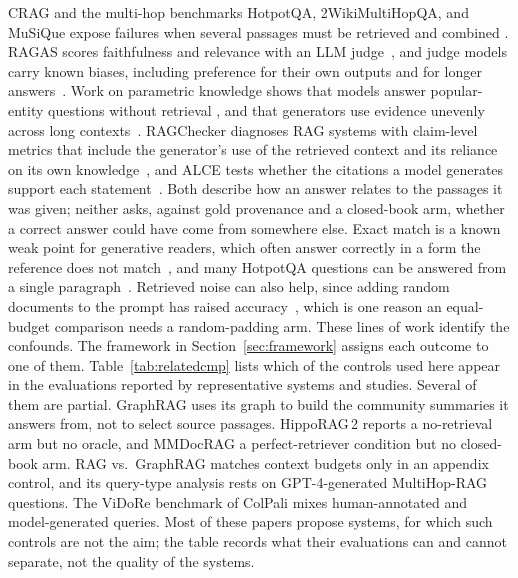 \documentclass[preprint,12pt]{elsarticle}
\begin{document}
CRAG and the multi-hop benchmarks HotpotQA, 2WikiMultiHopQA, and MuSiQue
expose failures when several passages must be retrieved and combined
\cite{yang2024crag,yang2018hotpotqa,ho20202wiki,trivedi2022musique}. RAGAS
scores faithfulness and relevance with an LLM judge~\cite{ragas}, and judge
models carry known biases, including preference for their own outputs and for
longer answers~\cite{zheng2023judge}. Work on parametric knowledge shows that
models answer popular-entity questions without retrieval
\cite{roberts2020knowledge,mallen2023popqa,kandpal2023longtail}, and that
generators use evidence unevenly across long contexts~\cite{liu2024lost}.
RAGChecker diagnoses RAG systems with claim-level metrics that include the
generator's use of the retrieved context and its reliance on its own
knowledge~\cite{ru2024ragchecker}, and ALCE tests whether the citations a
model generates support each statement~\cite{gao2023alce}. Both describe how
an answer relates to the passages it was given; neither asks, against gold
provenance and a closed-book arm, whether a correct answer could have come
from somewhere else. Exact match is a known weak point for generative readers,
which often answer correctly in a form the reference does not
match~\cite{kamalloo2023evaluating}, and many HotpotQA questions can be
answered from a single paragraph~\cite{min2019compositional,chen2019understanding}.
Retrieved noise can also help, since adding random documents to the prompt
has raised accuracy~\cite{cuconasu2024noise}, which is one reason an
equal-budget comparison needs a random-padding arm.
These lines of work identify the confounds. The framework in
Section~\ref{sec:framework} assigns each outcome to one of them.
Table~\ref{tab:relatedcmp} lists which of the controls used here appear in
the evaluations reported by representative systems and studies. Several of
them are partial. GraphRAG uses its graph to build the community summaries it
answers from, not to select source passages. HippoRAG\,2 reports a
no-retrieval arm but no oracle, and MMDocRAG a perfect-retriever condition but
no closed-book arm. RAG vs.\ GraphRAG matches context budgets only in an
appendix control, and its query-type analysis rests on GPT-4-generated
MultiHop-RAG questions. The ViDoRe benchmark of ColPali mixes human-annotated
and model-generated queries. Most of these papers propose systems, for which
such controls are not the aim; the table records what their evaluations can
and cannot separate, not the quality of the systems.
\end{document}

